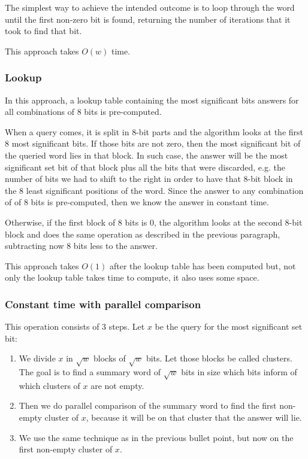 The simplest way to achieve the intended outcome is to loop through the word until the first non-zero bit is found, returning the number of iterations that it took to find that bit.

This approach takes $O(w)$ time.

\subsubsection{Lookup}

In this approach, a lookup table containing the most significant bits answers for all combinations of 8 bits is pre-computed.

When a query comes, it is split in 8-bit parts and the algorithm looks at the first 8 most significant bits. If those bits are not zero, then the most significant bit of the queried word lies in that block. In such case, the answer will be the most significant set bit of that block plus all the bits that were discarded, e.g. the number of bits we had to shift to the right in order to have that 8-bit block in the 8 least significant positions of the word. Since the answer to any combination of of 8 bits is pre-computed, then we know the answer in constant time.

Otherwise, if the first block of 8 bits is 0, the algorithm looks at the second 8-bit block and does the same operation as described in the previous paragraph, subtracting now 8 bits less to the answer.

This approach takes $O(1)$ after the lookup table has been computed but, not only the lookup table takes time to compute, it also uses some space.

\subsubsection{Constant time with parallel comparison}

This operation consists of 3 steps. Let $x$ be the query for the most significant set bit:
\begin{enumerate}
    \item We divide $x$ in $\sqrt{w}$ blocks of $\sqrt{w}$ bits. Let those blocks be called clusters. The goal is to find a summary word of $\sqrt{w}$ bits in size which bits inform of which clusters of $x$ are not empty.
    \item Then we do parallel comparison of the summary word to find the first non-empty cluster of $x$, because it will be on that cluster that the answer will lie.
    \item We use the same technique as in the previous bullet point, but now on the first non-empty cluster of $x$.
\end{enumerate}

